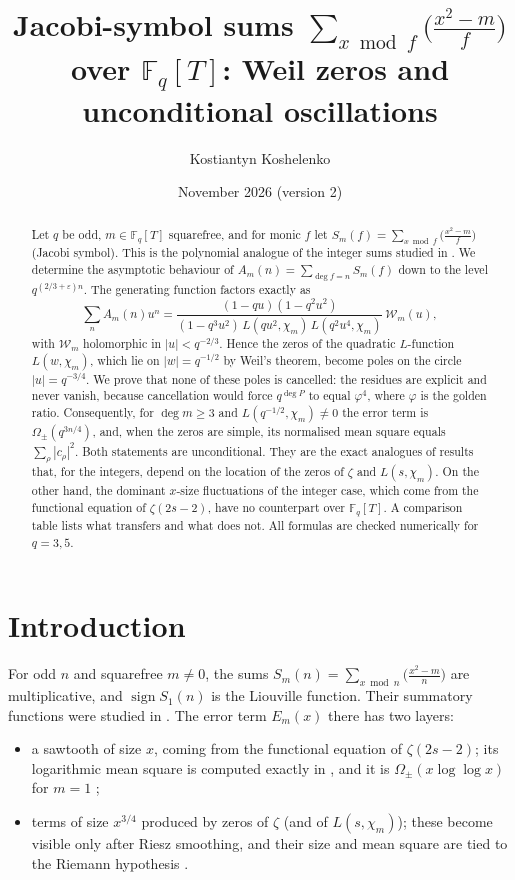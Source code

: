 \documentclass[11pt]{amsart}
\title[{Jacobi-symbol sums over $\mathbb F_q[T]$}]{Jacobi-symbol sums $\sum_{x\bmod f}\big(\tfrac{x^2-m}{f}\big)$ over $\mathbb{F}_q[T]$: Weil zeros and unconditional oscillations}
\author{Kostiantyn Koshelenko}
\date{November 2026 (version 2)}
\theoremstyle{remark}
\newcommand{\Fq}{\mathbb{F}_q}
\begin{document}
\begin{abstract}
Let $q$ be odd, $m\in\Fq[T]$ squarefree, and for monic $f$ let $S_m(f)=\sum_{x\bmod f}\big(\frac{x^2-m}{f}\big)$ (Jacobi symbol). This is the polynomial analogue of the integer sums studied in \cite{K}. We determine the asymptotic behaviour of $A_m(n)=\sum_{\deg f=n}S_m(f)$ down to the level $q^{(2/3+\varepsilon)n}$. The generating function factors exactly as
\[
\sum_n A_m(n)u^n=\frac{(1-qu)(1-q^2u^2)}{(1-q^3u^2)\,L(qu^2,\chi_m)\,L(q^2u^4,\chi_m)}\,\mathcal W_m(u),
\]
with $\mathcal W_m$ holomorphic in $|u|<q^{-2/3}$. Hence the zeros of the quadratic $L$-function $L(w,\chi_m)$, which lie on $|w|=q^{-1/2}$ by Weil's theorem, become poles on the circle $|u|=q^{-3/4}$. We prove that none of these poles is cancelled: the residues are explicit and never vanish, because cancellation would force $q^{\deg P}$ to equal $\varphi^4$, where $\varphi$ is the golden ratio. Consequently, for $\deg m\ge3$ and $L(q^{-1/2},\chi_m)\neq0$ the error term is $\Omega_\pm(q^{3n/4})$, and, when the zeros are simple, its normalised mean square equals $\sum_\rho|c_\rho|^2$. Both statements are unconditional. They are the exact analogues of results that, for the integers, depend on the location of the zeros of $\zeta$ and $L(s,\chi_m)$. On the other hand, the dominant $x$-size fluctuations of the integer case, which come from the functional equation of $\zeta(2s-2)$, have no counterpart over $\Fq[T]$. A comparison table lists what transfers and what does not. All formulas are checked numerically for $q=3,5$.
\end{abstract}

\maketitle

\section{Introduction}

For odd $n$ and squarefree $m\ne0$, the sums $S_m(n)=\sum_{x\bmod n}\big(\frac{x^2-m}{n}\big)$ are multiplicative, and $\operatorname{sign}S_1(n)$ is the Liouville function. Their summatory functions were studied in \cite{K}. The error term $E_m(x)$ there has two layers:
\begin{itemize}
\item a sawtooth of size $x$, coming from the functional equation of $\zeta(2s-2)$; its logarithmic mean square is computed exactly in \cite[Thm.~A]{K}, and it is $\Omega_\pm(x\log\log x)$ for $m=1$ \cite[Thm.~D]{K};
\item terms of size $x^{3/4}$ produced by zeros of $\zeta$ (and of $L(s,\chi_m)$); these become visible only after Riesz smoothing, and their size and mean square are tied to the Riemann hypothesis \cite[Thms.~B, C]{K}.
\end{itemize}
\end{document}
